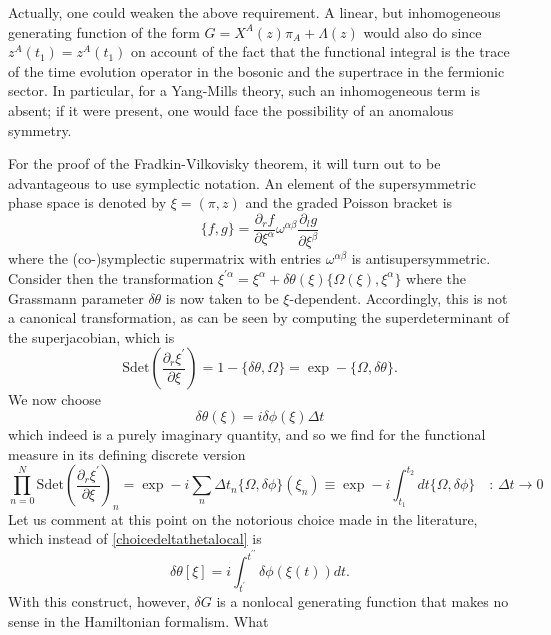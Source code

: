 \documentclass[a4paper,10pt]{article}
\begin{document}
Actually, one could weaken the above requirement. A linear, but inhomogeneous generating 
function of the form $G=X^A(z)\pi_A + \Lambda(z)$ would also do since $z^A(t_1)=z^A(t_1)$ on account of the fact that the functional integral is the trace of the time evolution operator in the bosonic and 
the supertrace in the fermionic sector. In particular, for a Yang-Mills theory, such an inhomogeneous term is absent; if it were present, one would face the possibility of an anomalous symmetry.

For the proof of the Fradkin-Vilkovisky theorem, it will turn out to be advantageous to 
use symplectic notation. An element of the supersymmetric phase space is denoted by 
$\xi=(\pi,z)$ and the graded Poisson bracket is
\begin{equation}
\{f,g\}=\frac{\partial_rf}{\partial\xi^{\alpha}}\omega^{\alpha\beta}\frac{\partial_lg}
{\partial\xi^{\beta}}
\end{equation}
where the (co-)symplectic supermatrix with entries $\omega^{\alpha\beta}$ is 
antisupersymmetric. Consider then the transformation 
$\xi^{\prime\alpha}=\xi^{\alpha}+\delta\theta(\xi)\{\Omega(\xi),\xi^{\alpha}\}$
where the Grassmann parameter $\delta\theta$ is now taken to be $\xi$-dependent. 
Accordingly, this is not a canonical transformation, as can be seen by computing the 
superdeterminant of the superjacobian, which is
\begin{equation}
\mathrm{Sdet}\left(\frac{\partial_r\xi^{\prime}}{\partial\xi}\right)=1-
\{\delta\theta,\Omega\}=\exp-\{\Omega,\delta\theta\}.
\end{equation}
We now choose
\begin{equation}\label{choicedeltathetalocal}
\delta\theta(\xi)=i\delta\phi(\xi)\Delta t
\end{equation}
which indeed is a purely imaginary quantity, and so we find for the functional measure in 
its defining discrete version
\begin{equation}
\prod_{n=0}^N\mathrm{Sdet}\left(\frac{\partial_r\xi^{\prime}}{\partial\xi}\right)_n
=\exp-i\sum_n\Delta t_n\{\Omega,\delta\phi\}(\xi_n)
\equiv\exp-i\int_{t_1}^{t_2}dt\{\Omega,\delta\phi\}\quad:\,\Delta t\rightarrow 0
\end{equation}
Let us comment at this point on the notorious choice made in the literature, which instead 
of \eqref{choicedeltathetalocal} is  
$$\delta\theta[\xi]=i\int_{t^{\prime}}^{t^{\prime\prime}}\delta\phi(\xi(t))dt.$$ 
With this construct, however, $\delta G$ is a 
nonlocal generating function that makes no sense in the Hamiltonian formalism. What 
\end{document}
